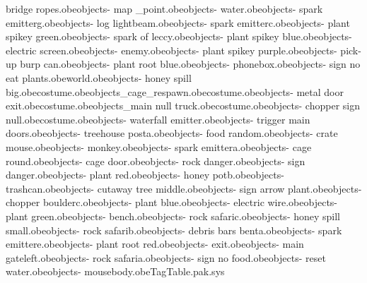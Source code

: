 bridge ropes.obe objects\bank - map _point.obe objects\bank - water.obe objects\bank - spark emitterg.obe objects\bank - log lightbeam.obe objects\bank - spark emitterc.obe objects\bank - plant spikey green.obe objects\bank - spark of leccy.obe objects\bank - plant spikey blue.obe objects\bank - electric screen.obe objects\bank - enemy.obe objects\bank - plant spikey purple.obe objects\bank - pick-up burp can.obe objects\bank - plant root blue.obe objects\bank - phonebox.obe objects\bank - sign no eat plants.obe world.obe objects\bank - honey spill big.obe costume\tazskater.obe objects\bank_cage_respawn.obe costume\skaterelbowpadl.obe objects\bank - metal door exit.obe costume\skaterelbowpadr.obe objects\bank_main null truck.obe costume\skaterskateboard.obe objects\bank - chopper sign null.obe costume\skaterbaseballcap.obe objects\bank - waterfall emitter.obe objects\bank - trigger main doors.obe objects\bank - treehouse posta.obe objects\bank - food random.obe objects\bank - crate mouse.obe objects\bank - monkey.obe objects\bank - spark emittera.obe objects\bank - cage round.obe objects\bank - cage door.obe objects\bank - rock danger.obe objects\bank - sign danger.obe objects\bank - plant red.obe objects\bank - honey potb.obe objects\bank - trashcan.obe objects\bank - cutaway tree middle.obe objects\bank - sign arrow plant.obe objects\bank - chopper boulderc.obe objects\bank - plant blue.obe objects\bank - electric wire.obe objects\bank - plant green.obe objects\bank - bench.obe objects\bank - rock safaric.obe objects\bank - honey spill small.obe objects\bank - rock safarib.obe objects\bank - debris bars benta.obe objects\bank - spark emittere.obe objects\bank - plant root red.obe objects\camera - exit.obe objects\bank - main gateleft.obe objects\bank - rock safaria.obe objects\bank - sign no food.obe objects\bank - reset water.obe objects\bank - mousebody.obe TagTable.pak.sys 